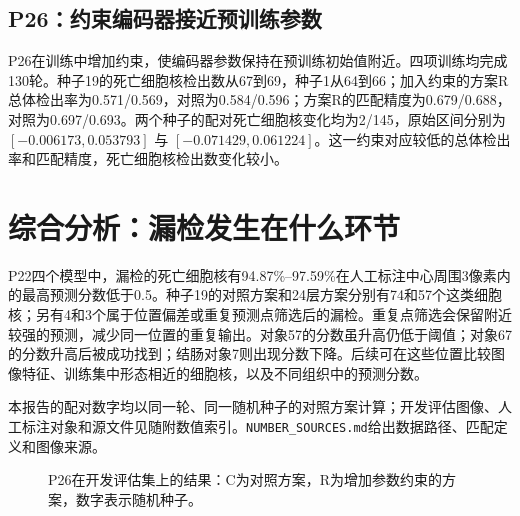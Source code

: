 \documentclass[UTF8,zihao=-4,fontset=windows]{ctexart}
\begin{document}
\subsection{P26：约束编码器接近预训练参数}
P26在训练中增加约束，使编码器参数保持在预训练初始值附近。四项训练均完成130轮。种子19的死亡细胞核检出数从67到69，种子1从64到66；加入约束的方案R总体检出率为0.571/0.569，对照为0.584/0.596；方案R的匹配精度为0.679/0.688，对照为0.697/0.693。两个种子的配对死亡细胞核变化均为2/145，原始区间分别为 $[-0.006173,0.053793]$ 与 $[-0.071429,0.061224]$。这一约束对应较低的总体检出率和匹配精度，死亡细胞核检出数变化较小。

\section{综合分析：漏检发生在什么环节}
P22四个模型中，漏检的死亡细胞核有94.87\%--97.59\%在人工标注中心周围3像素内的最高预测分数低于0.5。种子19的对照方案和24层方案分别有74和57个这类细胞核；另有4和3个属于位置偏差或重复预测点筛选后的漏检。重复点筛选会保留附近较强的预测，减少同一位置的重复输出。对象57的分数虽升高仍低于阈值；对象67的分数升高后被成功找到；结肠对象7则出现分数下降。后续可在这些位置比较图像特征、训练集中形态相近的细胞核，以及不同组织中的预测分数。

本报告的配对数字均以同一轮、同一随机种子的对照方案计算；开发评估图像、人工标注对象和源文件见随附数值索引。\texttt{NUMBER\_SOURCES.md}给出数据路径、匹配定义和图像来源。
\begin{figure}[H]\centering\caption{P26在开发评估集上的结果：C为对照方案，R为增加参数约束的方案，数字表示随机种子。}\end{figure}
\end{document}

